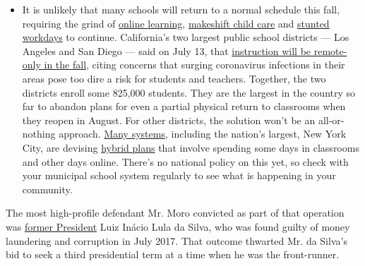 \begin{itemize}
  \begin{itemize}
  \tightlist
  \item
    It is unlikely that many schools will return to a normal schedule
    this fall, requiring the grind of
    \href{https://www.nytimes3xbfgragh.onion/2020/06/05/us/coronavirus-education-lost-learning.html?action=click\&pgtype=Article\&state=default\&region=MAIN_CONTENT_3\&context=storylines_faq}{online
    learning},
    \href{https://www.nytimes3xbfgragh.onion/2020/05/29/us/coronavirus-child-care-centers.html?action=click\&pgtype=Article\&state=default\&region=MAIN_CONTENT_3\&context=storylines_faq}{makeshift
    child care} and
    \href{https://www.nytimes3xbfgragh.onion/2020/06/03/business/economy/coronavirus-working-women.html?action=click\&pgtype=Article\&state=default\&region=MAIN_CONTENT_3\&context=storylines_faq}{stunted
    workdays} to continue. California's two largest public school
    districts --- Los Angeles and San Diego --- said on July 13, that
    \href{https://www.nytimes3xbfgragh.onion/2020/07/13/us/lausd-san-diego-school-reopening.html?action=click\&pgtype=Article\&state=default\&region=MAIN_CONTENT_3\&context=storylines_faq}{instruction
    will be remote-only in the fall}, citing concerns that surging
    coronavirus infections in their areas pose too dire a risk for
    students and teachers. Together, the two districts enroll some
    825,000 students. They are the largest in the country so far to
    abandon plans for even a partial physical return to classrooms when
    they reopen in August. For other districts, the solution won't be an
    all-or-nothing approach.
    \href{https://bioethics.jhu.edu/research-and-outreach/projects/eschool-initiative/school-policy-tracker/}{Many
    systems}, including the nation's largest, New York City, are
    devising
    \href{https://www.nytimes3xbfgragh.onion/2020/06/26/us/coronavirus-schools-reopen-fall.html?action=click\&pgtype=Article\&state=default\&region=MAIN_CONTENT_3\&context=storylines_faq}{hybrid
    plans} that involve spending some days in classrooms and other days
    online. There's no national policy on this yet, so check with your
    municipal school system regularly to see what is happening in your
    community.
  \end{itemize}
\end{itemize}

The most high-profile defendant Mr. Moro convicted as part of that
operation was
\href{https://www.nytimes3xbfgragh.onion/2018/04/07/world/americas/brazil-lula-surrenders-luiz-inacio-lula-da-silva-.html?action=click\&module=RelatedCoverage\&pgtype=Article\&region=Footer}{former
President} Luiz Inácio Lula da Silva, who was found guilty of money
laundering and corruption in July 2017. That outcome thwarted Mr. da
Silva's bid to seek a third presidential term at a time when he was the
front-runner.

